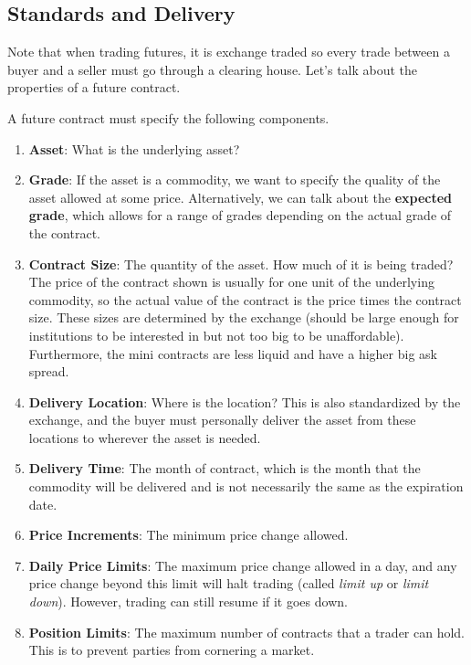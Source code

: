 \documentclass{article}
\begin{document}
  \subsection{Standards and Delivery}

    Note that when trading futures, it is exchange traded so every trade between a buyer and a seller must go through a clearing house. Let's talk about the properties of a future contract. 

    \begin{definition}
      A future contract must specify the following components. 
      \begin{enumerate}
        \item \textbf{Asset}: What is the underlying asset? 

        \item \textbf{Grade}: If the asset is a commodity, we want to specify the quality of the asset allowed at some price. Alternatively, we can talk about the \textbf{expected grade}, which allows for a range of grades depending on the actual grade of the contract.  

        \item \textbf{Contract Size}: The quantity of the asset. How much of it is being traded? The price of the contract shown is usually for one unit of the underlying commodity, so the actual value of the contract is the price times the contract size. These sizes are determined by the exchange (should be large enough for institutions to be interested in but not too big to be unaffordable). Furthermore, the mini contracts are less liquid and have a higher big ask spread. 

        \item \textbf{Delivery Location}: Where is the location? This is also standardized by the exchange, and the buyer must personally deliver the asset from these locations to wherever the asset is needed. 

        \item \textbf{Delivery Time}: The month of contract, which is the month that the commodity will be delivered and is not necessarily the same as the expiration date. 

        \item \textbf{Price Increments}: The minimum price change allowed. 

        \item \textbf{Daily Price Limits}: The maximum price change allowed in a day, and any price change beyond this limit will halt trading (called \textit{limit up} or \textit{limit down}). However, trading can still resume if it goes down. 

        \item \textbf{Position Limits}: The maximum number of contracts that a trader can hold. This is to prevent parties from cornering a market. 
      \end{enumerate}
    \end{definition}
\end{document}
